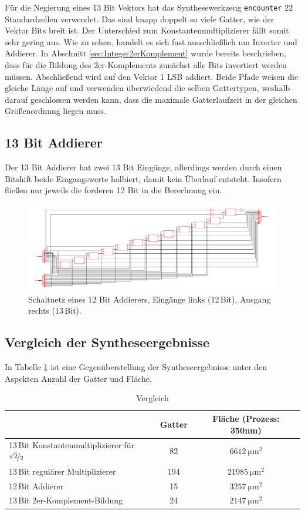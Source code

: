 Für die Negierung eines 13 Bit Vektors hat das Synthesewerkzeug \texttt{encounter} 22 Standardzellen verwendet. Das sind knapp doppelt so viele Gatter, wie der Vektor 
Bits breit ist. Der Unterschied zum Konstantenmultiplizierer fällt somit sehr gering aus. 
Wie zu sehen, handelt es sich fast ausschließlich um Inverter und Addierer. In Abschnitt \ref{sec:Integer2erKomplement} wurde bereits beschrieben, dass für die Bildung des
2er-Komplements zunächst alle Bits invertiert werden müssen. Abschließend wird auf den Vektor 1 LSB addiert. 
Beide Pfade weisen die gleiche Länge auf und verwenden überwiedend die selben
Gattertypen, weshalb darauf geschlossen werden kann, dass die maximale Gatterlaufzeit in der gleichen Größenordnung liegen muss.

\subsection{13 Bit Addierer}
Der 13 Bit Addierer hat zwei 13 Bit Eingänge, allerdings werden durch einen Bitshift beide Eingangswerte halbiert, damit kein Überlauf entsteht. Insofern fließen nur jeweils 
die forderen 12 Bit in die Berechnung ein.
\begin{figure}[htbp]
 \centering
 \includegraphics[width=0.99\textwidth]{img/13Bit_Addierer.png}
 \caption{Schaltnetz eines 12 Bit Addierers, Eingänge links (12\,Bit), Ausgang rechts (13\,Bit).}
 \label{pic:13BitAddierer}
\end{figure}

\subsection{Vergleich der Syntheseergebnisse}
 In Tabelle \ref{tab:VergleichSyntheseergebnisse} ist eine Gegenüberstellung der Syntheseergebnisse unter den Aspekten Anzahl der Gatter und Fläche.
\begin{table}[!ht]
\centering
 \caption{Vergleich}
 \label{tab:VergleichSyntheseergebnisse}
 \begin{tabular}{lcc}
 \hline
				&Gatter  	&Fläche (Prozess: 350nm) \\
  \hline	
  13\,Bit Konstantenmultiplizierer für $\nicefrac{\sqrt{2}}{2}$	& 82		& $\SI{6612}{\um^2}$ \\
  13\,Bit regulärer Multiplizierer				& 194		& $\SI{21985}{\um^2}$\\
  12\,Bit Addierer						& 15		& $\SI{3257}{\um^2}$\\
  13\,Bit 2er-Komplement-Bildung				& 24		& $\SI{2147}{\um^2}$\\
  \hline
 \end{tabular}
\end{table}



